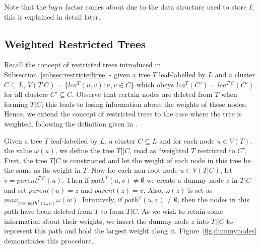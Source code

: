 \documentclass[12pt,a4paper]{article}
\newcommand{\weight}{\omega}
\begin{document}
    Note that the $log\,n$ factor comes about due to the data structure used to store $I$; this is explained in detail later.

    \subsection{Weighted Restricted Trees}
    \label{subsec:restrictedweighted}

    Recall the concept of restricted trees introduced in Subsection~\ref{subsec:restrictedtree} - given a tree $T$ leaf-labelled by $L$ and a cluster $C \subseteq L$, $V(T|C) = \{lca^T(u, v) : u, v \in C\}$ which obeys $lca^T(C') = lca^{T|C}(C')$ for all clusters $C' \subseteq C$. Observe that certain nodes are deleted from $T$ when forming $T|C$; this leads to losing information about the weights of these nodes. Hence, we extend the concept of restricted trees to the case where the tree is weighted, following the definition given in \cite{jansson2018algorithms}.

    Given a tree $T$ leaf-labelled by $L$, a cluster $C \subseteq L$ and for each node $u \in V(T)$, the value $\weight(u)$, we define the tree $T||C$, read as ``weighted $T$ restricted to $C$''. First, the tree $T|C$ is constructed and let the weight of each node in this tree be the same as its weight in $T$. Now for each non-root node $u \in V(T|C)$, let $v = parent^{T|C}(u)$. Then if $path^{T}(u, v) \neq \emptyset$ we create a dummy node $z$ in $T|C$ and set $parent(u) = z$ and $parent(z) = v$. Also, $\weight(z)$ is set as $max_{w \in path^{T}(u, v)} \weight(w)$. Intuitively, if $path^{T}(u, v) \neq \emptyset$, then the nodes in this path have been deleted from $T$ to form $T|C$. As we wish to retain some information about their weights, we insert the dummy node $z$ into $T||C$ to represent this path and hold the largest weight along it. Figure~\ref{fig:dummynodes} demonstrates this procedure.
\end{document}
